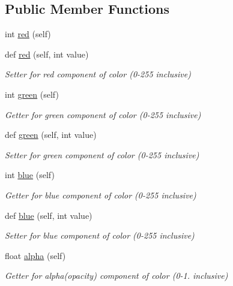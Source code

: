 \subsection*{Public Member Functions}
\begin{DoxyCompactItemize}
\item 
int \mbox{\hyperlink{classbridges_1_1color_1_1_color_acaeb134ddf621e96eadd79be530f62c2}{red}} (self)
\item 
def \mbox{\hyperlink{classbridges_1_1color_1_1_color_a672c865920fd1810986064ffa54bc9f1}{red}} (self, int value)
\begin{DoxyCompactList}\small\item\em Setter for red component of color (0-\/255 inclusive) \end{DoxyCompactList}\item 
int \mbox{\hyperlink{classbridges_1_1color_1_1_color_ac6548f00c79154d1f14109602eccb6dd}{green}} (self)
\begin{DoxyCompactList}\small\item\em Getter for green component of color (0-\/255 inclusive) \end{DoxyCompactList}\item 
def \mbox{\hyperlink{classbridges_1_1color_1_1_color_a80e1af05cab786ba1626b0e6558b5008}{green}} (self, int value)
\begin{DoxyCompactList}\small\item\em Setter for green component of color (0-\/255 inclusive) \end{DoxyCompactList}\item 
int \mbox{\hyperlink{classbridges_1_1color_1_1_color_a126bfa0dc440db085a145f05952c8110}{blue}} (self)
\begin{DoxyCompactList}\small\item\em Getter for blue component of color (0-\/255 inclusive) \end{DoxyCompactList}\item 
def \mbox{\hyperlink{classbridges_1_1color_1_1_color_a665547ee2b0b9eff8e43b8f802a56e49}{blue}} (self, int value)
\begin{DoxyCompactList}\small\item\em Setter for blue component of color (0-\/255 inclusive) \end{DoxyCompactList}\item 
float \mbox{\hyperlink{classbridges_1_1color_1_1_color_a4cfa0130d36e311f97959d806fcb4415}{alpha}} (self)
\begin{DoxyCompactList}\small\item\em Getter for alpha(opacity) component of color (0-\/1. inclusive) \end{DoxyCompactList}\item 

\end{DoxyCompactItemize}
